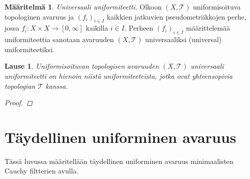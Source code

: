 \documentclass[12pt,a4paper,leqno]{report}
\newcommand{\T}{\mathcal{T}}
\theoremstyle{plain}
\newtheorem{lause}[equation]{Lause}
\theoremstyle{definition}
\newtheorem{maar}[equation]{Määritelmä}
\theoremstyle{remark}
\begin{document}
\begin{maar}
\emph{Universaali uniformiteetti.} 
Olkoon $(X,\T)$ uniformisoituva topologinen avaruus ja 
$(f_i)_{i\in I}$ kaikkien jatkuvien pseudometriikkojen perhe, 
jossa $f_i\colon X\times X\rightarrow [0,\infty]$ 
kaikilla $i\in I$. 
Perheen $(f_i)_{i\in I}$ määrittelemää uniformiteettia sanotaan avaruuden $(X,\T)$ universaaliksi (universal) uniformiteetiksi. 
\end{maar}
\begin{lause}
Uniformisoituvan topologisen avaruuden $(X,\T)$ universaali uniformiteetti on hienoin niistä uniformiteeteista, jotka ovat yhteensopivia topologian $\T$ kanssa. 
\begin{proof}
\end{proof}
\end{lause}
%
%
\chapter{Täydellinen uniforminen avaruus}
Tässä luvussa määritellään täydellinen uniforminen avaruus minimaalisten Cauchy filtterien avulla.
\end{document}

